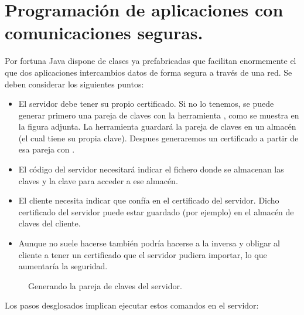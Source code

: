 \documentclass[a4paper,12pt,spanish]{sphinxmanual}
\begin{document}
\section{Programación de aplicaciones con comunicaciones seguras.}
\label{textos/tema5:programacion-de-aplicaciones-con-comunicaciones-seguras}
Por fortuna Java dispone de clases ya prefabricadas que facilitan enormemente el que dos aplicaciones intercambios datos de forma segura a través de una red. Se deben considerar los siguientes puntos:
\begin{itemize}
\item {} 
El servidor debe tener su propio certificado. Si no lo tenemos, se puede generar primero una pareja de claves con la herramienta , como se muestra en la figura adjunta. La herramienta guardará la pareja de claves en un almacén (el cual tiene su propia clave). Despues generaremos un certificado a partir de esa pareja con .

\item {} 
El código del servidor necesitará indicar el fichero donde se almacenan las claves y la clave para acceder a ese almacén.

\item {} 
El cliente necesita indicar que confía en el certificado del servidor. Dicho certificado del servidor puede estar guardado (por ejemplo) en el almacén de claves del cliente.

\item {} 
Aunque no suele hacerse también podría hacerse a la inversa y obligar al cliente a tener un certificado que el servidor pudiera importar, lo que aumentaría la seguridad.

\end{itemize}
\begin{figure}[htbp]
\centering
\capstart

\noindent{}
\caption{Generando la pareja de claves del servidor.}\label{textos/tema5:id1}\end{figure}

Los pasos desglosados implican ejecutar estos comandos en el servidor:
\end{document}
